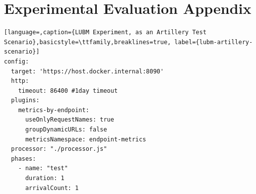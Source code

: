 %

\chapter{Experimental Evaluation Appendix}
\label{app:appendices:experimental-evaluation}

\begin{lstlisting}[language=,caption={LUBM Experiment, as an Artillery Test Scenario},basicstyle=\ttfamily,breaklines=true, label={lubm-artillery-scenario}]
config:
  target: 'https://host.docker.internal:8090'
  http:
    timeout: 86400 #1day timeout
  plugins:
    metrics-by-endpoint:
      useOnlyRequestNames: true
      groupDynamicURLs: false
      metricsNamespace: endpoint-metrics
  processor: "./processor.js"
  phases:  
    - name: "test"
      duration: 1
      arrivalCount: 1
     

\end{lstlisting}
